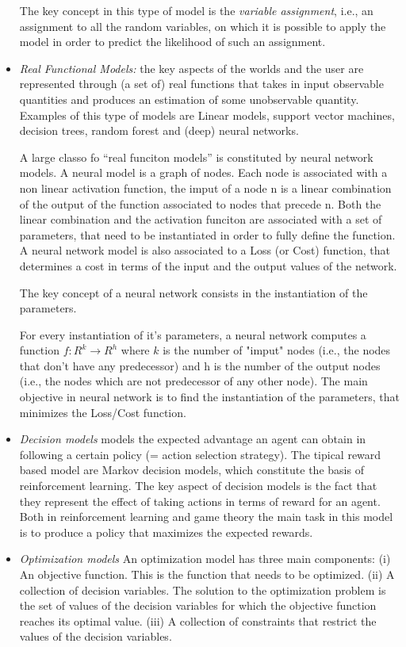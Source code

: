 \begin{itemize}
The key concept in this type of model is the \emph{variable assignment},
i.e., an assignment to all the random variables, on which it is
possible to apply the model in order to predict the likelihood of such
an assignment.

\item \emph{Real Functional Models:} the key aspects of the worlds and
  the user are represented through (a set of) real functions that
  takes in input observable quantities and produces an estimation of
  some unobservable quantity. Examples of this type of models are
  Linear models, support vector machines, decision trees, random
  forest and (deep) neural networks.

  A large classo fo ``real funciton models'' is constituted by neural
  network models. A neural model is a graph of nodes. Each node is
  associated with a non linear activation function, the imput of a
  node n is a linear combination of the output of the function
  associated to nodes that precede n. Both the linear combination and
  the activation funciton are associated with a set of parameters,
  that need to be instantiated in order to fully define the
  function. A neural network model is also associated to a Loss (or
  Cost) function, that determines a cost in terms of the input and the
  output values of the network.

  The key concept of a neural network consists in the instantiation of the parameters.

  For every instantiation of it's parameters, a neural network
  computes a function $f:R^k\rightarrow R^h$ where $k$ is the number
  of "imput" nodes (i.e., the nodes that don't have any predecessor)
  and h is the number of the output nodes (i.e., the nodes which are
  not predecessor of any other node). The main objective in neural
  network is to find the instantiation of the parameters, that
  minimizes the Loss/Cost function.

\item \emph{Decision models} models the expected advantage an agent
  can obtain in following a certain policy (= action selection
  strategy). The tipical reward based model are Markov decision
  models, which constitute the basis of reinforcement learning. The
  key aspect of decision models is the fact that they represent the
  effect of taking actions in terms of reward for an agent. Both in
  reinforcement learning and game theory the main task in this model
  is to produce a policy that maximizes the expected rewards.

\item \emph{Optimization models} An optimization model has three main
  components: (i) An objective function. This is the function that
  needs to be optimized. (ii) A collection of decision variables. The
  solution to the optimization problem is the set of values of the
  decision variables for which the objective function reaches its
  optimal value. (iii) A collection of constraints that restrict the
  values of the decision variables.

\end{itemize}

